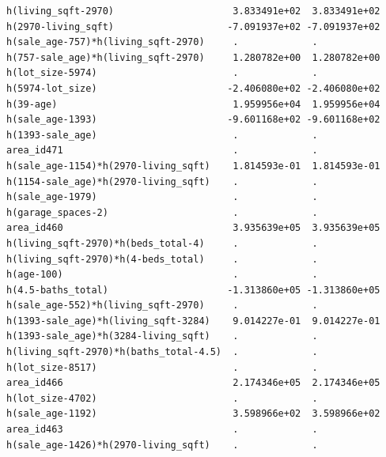 \documentclass[
]{article}
\begin{document}
\begin{verbatim}
h(living_sqft-2970)                     3.833491e+02  3.833491e+02
h(2970-living_sqft)                    -7.091937e+02 -7.091937e+02
h(sale_age-757)*h(living_sqft-2970)     .             .           
h(757-sale_age)*h(living_sqft-2970)     1.280782e+00  1.280782e+00
h(lot_size-5974)                        .             .           
h(5974-lot_size)                       -2.406080e+02 -2.406080e+02
h(39-age)                               1.959956e+04  1.959956e+04
h(sale_age-1393)                       -9.601168e+02 -9.601168e+02
h(1393-sale_age)                        .             .           
area_id471                              .             .           
h(sale_age-1154)*h(2970-living_sqft)    1.814593e-01  1.814593e-01
h(1154-sale_age)*h(2970-living_sqft)    .             .           
h(sale_age-1979)                        .             .           
h(garage_spaces-2)                      .             .           
area_id460                              3.935639e+05  3.935639e+05
h(living_sqft-2970)*h(beds_total-4)     .             .           
h(living_sqft-2970)*h(4-beds_total)     .             .           
h(age-100)                              .             .           
h(4.5-baths_total)                     -1.313860e+05 -1.313860e+05
h(sale_age-552)*h(living_sqft-2970)     .             .           
h(1393-sale_age)*h(living_sqft-3284)    9.014227e-01  9.014227e-01
h(1393-sale_age)*h(3284-living_sqft)    .             .           
h(living_sqft-2970)*h(baths_total-4.5)  .             .           
h(lot_size-8517)                        .             .           
area_id466                              2.174346e+05  2.174346e+05
h(lot_size-4702)                        .             .           
h(sale_age-1192)                        3.598966e+02  3.598966e+02
area_id463                              .             .           
h(sale_age-1426)*h(2970-living_sqft)    .             .           
                                                                  

\end{verbatim}
\end{document}
